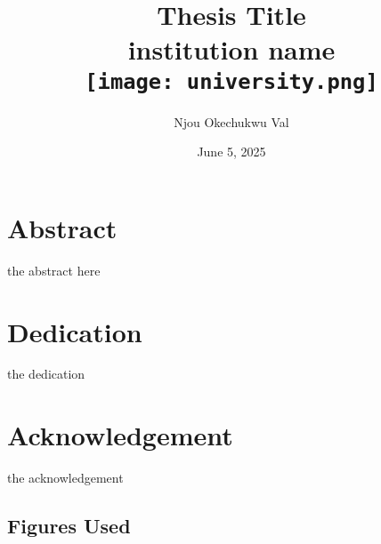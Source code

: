 \documentclass[12pt]{report}
\title{
	{Thesis Title}\\
	{\large institution name}\\
	{\texttt{[image: university.png]}}
}
\author{Njou Okechukwu Val}
\date{June 5, 2025}
\begin{document}
	
	\chapter*{Abstract}
	the abstract here 
	
	\chapter*{Dedication}
	the dedication
	
	\chapter*{Acknowledgement}
	the acknowledgement
	
	\tableofcontents
	\listoffigures
	\listoftables
	
	
	
	
	
	\newpage
	
	
	
	
	\newpage
	\section*{Figures Used}
	
	
	
	
\end{document}
